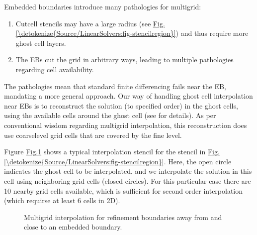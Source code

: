 \documentclass[letterpaper,10pt,english]{sphinxmanual}
\let\sphinxpxdimen\pdfpxdimen\else\newdimen\sphinxpxdimen
\begin{document}
Embedded boundaries introduce many pathologies for multigrid:
\begin{enumerate}
%
\item {} 
Cut\sphinxhyphen{}cell stencils may have a large radius (see \hyperref[\detokenize{Source/LinearSolvers:fig-stencilregion}]{Fig.\@ \ref{\detokenize{Source/LinearSolvers:fig-stencilregion}}}) and thus require more ghost cell layers.

\item {} 
The EBs cut the grid in arbitrary ways, leading to multiple pathologies regarding cell availability.

\end{enumerate}

The pathologies mean that standard finite differencing fails near the EB, mandating a more general approach.
Our way of handling ghost cell interpolation near EBs is to reconstruct the solution (to specified order) in the ghost cells, using the available cells around the ghost cell (see {\hyperref[\detokenize{Utilities/LeastSquares:chap-leastsquares}]{}} for details).
As per conventional wisdom regarding multigrid interpolation, this reconstruction does  use coarse\sphinxhyphen{}level grid cells that are covered by the fine level.

Figure \hyperref[\detokenize{Source/LinearSolvers:fig-ebmultigridinterpolation}]{Fig.\@ \ref{\detokenize{Source/LinearSolvers:fig-ebmultigridinterpolation}}} shows a typical interpolation stencil for the stencil in \hyperref[\detokenize{Source/LinearSolvers:fig-stencilregion}]{Fig.\@ \ref{\detokenize{Source/LinearSolvers:fig-stencilregion}}}.
Here, the open circle indicates the ghost cell to be interpolated, and we interpolate the solution in this cell using neighboring grid cells (closed circles).
For this particular case there are 10 nearby grid cells available, which is sufficient for second order interpolation (which requirse at least 6 cells in 2D).

\begin{figure}[htb]
\centering
\capstart

\noindent\sphinxincludegraphics[width=360\sphinxpxdimen]{{EBMultigridInterpolation}.png}
\caption{Multigrid interpolation for refinement boundaries away from and close to an embedded boundary.}\label{\detokenize{Source/LinearSolvers:id5}}\label{\detokenize{Source/LinearSolvers:fig-ebmultigridinterpolation}}\end{figure}
\end{document}
